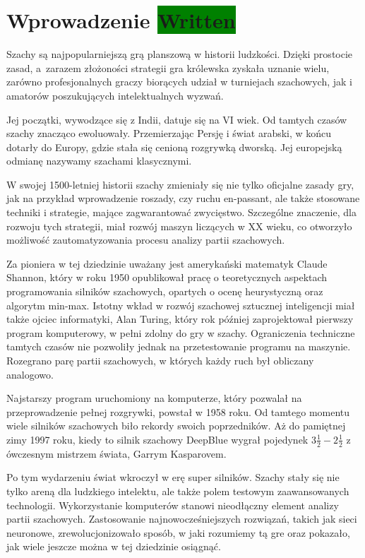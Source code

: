 \section{Wprowadzenie \colorbox{green}{Written}}
\label{sec:wprowadzenie}

Szachy są najpopularniejszą grą planszową w historii ludzkości.
Dzięki prostocie zasad, a~zarazem złożoności strategii gra królewska zyskała uznanie wielu, zarówno profesjonalnych graczy biorących udział w turniejach szachowych, jak i amatorów poszukujących intelektualnych wyzwań.


Jej początki, wywodzące się z Indii, datuje się na VI wiek.
Od tamtych czasów szachy znacząco ewoluowały.
Przemierzając Persję i świat arabski, w końcu dotarły do Europy, gdzie stała się cenioną rozgrywką dworską.
Jej europejską odmianę nazywamy szachami klasycznymi.


W swojej 1500-letniej historii szachy zmieniały się nie tylko oficjalne zasady gry, jak na przykład wprowadzenie roszady, czy ruchu en-passant, ale także stosowane techniki i strategie, mające zagwarantować zwycięstwo.
Szczególne znaczenie, dla rozwoju tych strategii, miał rozwój maszyn liczących w XX wieku, co otworzyło możliwość zautomatyzowania procesu analizy partii szachowych.


Za pioniera w tej dziedzinie uważany jest amerykański matematyk Claude Shannon, który w roku 1950 opublikował pracę o teoretycznych aspektach programowania silników szachowych, opartych o ocenę heurystyczną oraz algorytm min-max.
Istotny wkład w rozwój szachowej sztucznej inteligencji miał także ojciec informatyki, Alan Turing, który rok później zaprojektował pierwszy program komputerowy, w pełni zdolny do gry w szachy.
Ograniczenia techniczne tamtych czasów nie pozwoliły jednak na przetestowanie programu na maszynie.
Rozegrano parę partii szachowych, w których każdy ruch był obliczany analogowo.


Najstarszy program uruchomiony na komputerze, który pozwalał na przeprowadzenie pełnej rozgrywki, powstał w 1958 roku.
Od tamtego momentu wiele silników szachowych biło rekordy swoich poprzedników.
Aż do pamiętnej zimy 1997 roku, kiedy to silnik szachowy DeepBlue wygrał pojedynek $3\frac{1}{2} - 2\frac{1}{2}$ z ówczesnym mistrzem świata, Garrym Kasparovem.


Po tym wydarzeniu świat wkroczył w erę super silników.
Szachy stały się nie tylko areną dla ludzkiego intelektu, ale także polem testowym zaawansowanych technologii.
Wykorzystanie komputerów stanowi nieodłączny element analizy partii szachowych.
Zastosowanie najnowocześniejszych rozwiązań, takich jak sieci neuronowe, zrewolucjonizowało sposób, w jaki rozumiemy tą gre oraz pokazało, jak wiele jeszcze można w tej dziedzinie osiągnąć.